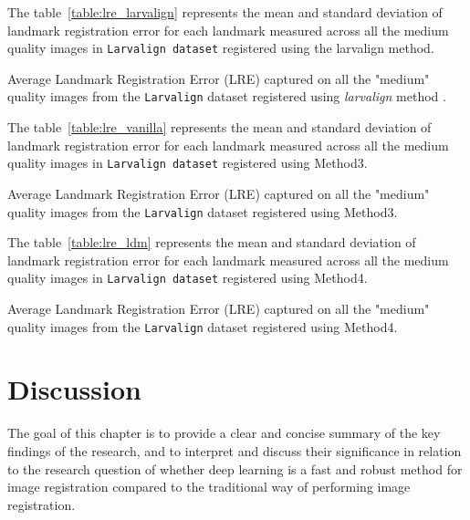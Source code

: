 \documentclass{report}
\begin{document}
	
	
	
	
	
	
	
	
	\clearpage
	\clearpage
	
	
	
	The table~\ref{table:lre_larvalign} represents the mean and standard deviation of landmark registration error for each landmark measured across all the medium quality images in \texttt{Larvalign dataset} registered using the larvalign method.
	
	\begin{table}[h]
		\centering
		
		\caption{Average Landmark Registration Error (LRE) captured on all the "medium" quality images from the \texttt{Larvalign} dataset registered using \emph{larvalign} method \cite{larvalign}.}
		\label{table:lre_larvalign}
	\end{table}

	The table~\ref{table:lre_vanilla} represents the mean and standard deviation of landmark registration error for each landmark measured across all the medium quality images in \texttt{Larvalign dataset} registered using Method3.
	
	\begin{table}[h]
		\centering
		
		\caption{Average Landmark Registration Error (LRE) captured on all the "medium" quality images from the \texttt{Larvalign} dataset registered using Method3.}
		\label{table:lre_vanilla}
	\end{table}

	The table~\ref{table:lre_ldm} represents the mean and standard deviation of landmark registration error for each landmark measured across all the medium quality images in \texttt{Larvalign dataset} registered using Method4.
	
	\begin{table}[h]
		\centering
		
		\caption{Average Landmark Registration Error (LRE) captured on all the "medium" quality images from the \texttt{Larvalign} dataset registered using Method4.}
		\label{table:lre_ldm}
	\end{table}
	
	\chapter{Discussion}
	The goal of this chapter is to provide a clear and concise summary of the key findings of the research, and to interpret and discuss their significance in relation to the research question of whether deep learning is a fast and robust method for image registration compared to the traditional way of performing image registration.
	
\end{document}
